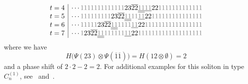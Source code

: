 \documentclass[reqno]{amsart}
\newcommand{\bon}{\overline{1}}
\theoremstyle{plain}
\theoremstyle{definition}
\numberwithin{equation}{section}
\begin{document}
\[{\begin{array}{c|c}
t = 4 & \cdots {\color{gray} 1} {\color{gray} 1} {\color{gray} 1} {\color{gray} 1} {\color{gray} 1} {\color{gray} 1} {\color{gray} 1} {\color{gray} 1} {\color{gray} 1} {\color{gray} 1} {\color{gray} 1} {\color{gray} 1} {\color{gray} 1} 2 3 \overline{2} \overline{2} \underline{\underline{{\color{gray} 1} {\color{gray} 1}}} \underline{{\color{gray} 1} {\color{gray} 1}} 2 2 {\color{gray} 1} {\color{gray} 1} {\color{gray} 1} {\color{gray} 1} {\color{gray} 1} {\color{gray} 1} {\color{gray} 1} {\color{gray} 1} {\color{gray} 1} {\color{gray} 1} {\color{gray} 1} {\color{gray} 1} {\color{gray} 1} \\
t = 5 & \cdots {\color{gray} 1} {\color{gray} 1} {\color{gray} 1} {\color{gray} 1} {\color{gray} 1} {\color{gray} 1} {\color{gray} 1} {\color{gray} 1} {\color{gray} 1} 2 3 \overline{2} \overline{2} \underline{\underline{{\color{gray} 1} {\color{gray} 1}}} {\color{gray} 1} {\color{gray} 1} \underline{{\color{gray} 1} {\color{gray} 1}} 2 2 {\color{gray} 1} {\color{gray} 1} {\color{gray} 1} {\color{gray} 1} {\color{gray} 1} {\color{gray} 1} {\color{gray} 1} {\color{gray} 1} {\color{gray} 1} {\color{gray} 1} {\color{gray} 1} {\color{gray} 1} {\color{gray} 1} {\color{gray} 1} {\color{gray} 1} \\
t = 6 & \cdots {\color{gray} 1} {\color{gray} 1} {\color{gray} 1} {\color{gray} 1} {\color{gray} 1} 2 3 \overline{2} \overline{2} \underline{\underline{{\color{gray} 1} {\color{gray} 1}}} {\color{gray} 1} {\color{gray} 1} {\color{gray} 1} {\color{gray} 1} \underline{{\color{gray} 1} {\color{gray} 1}} 2 2 {\color{gray} 1} {\color{gray} 1} {\color{gray} 1} {\color{gray} 1} {\color{gray} 1} {\color{gray} 1} {\color{gray} 1} {\color{gray} 1} {\color{gray} 1} {\color{gray} 1} {\color{gray} 1} {\color{gray} 1} {\color{gray} 1} {\color{gray} 1} {\color{gray} 1} {\color{gray} 1} {\color{gray} 1} \\
t = 7 & \cdots {\color{gray} 1} 2 3 \overline{2} \overline{2} \underline{\underline{{\color{gray} 1} {\color{gray} 1}}} {\color{gray} 1} {\color{gray} 1} {\color{gray} 1} {\color{gray} 1} {\color{gray} 1} {\color{gray} 1} \underline{{\color{gray} 1} {\color{gray} 1}} 2 2 {\color{gray} 1} {\color{gray} 1} {\color{gray} 1} {\color{gray} 1} {\color{gray} 1} {\color{gray} 1} {\color{gray} 1} {\color{gray} 1} {\color{gray} 1} {\color{gray} 1} {\color{gray} 1} {\color{gray} 1} {\color{gray} 1} {\color{gray} 1} {\color{gray} 1} {\color{gray} 1} {\color{gray} 1} {\color{gray} 1} {\color{gray} 1} \\
\end{array}}
\]
where we have
\[
H\bigl(\Psi(23) \otimes \Psi(\bon\bon)\bigr) = H(12 \otimes \emptyset) = 2
\]
and a phase shift of $2 \cdot 2 - 2 = 2$.
For additional examples for this soliton in type $C_n^{(1)}$, see~\cite[Ex.~4.6]{HKOTY02} and~\cite[Ex.~3.5,3.6]{HKT00}.
\end{document}
